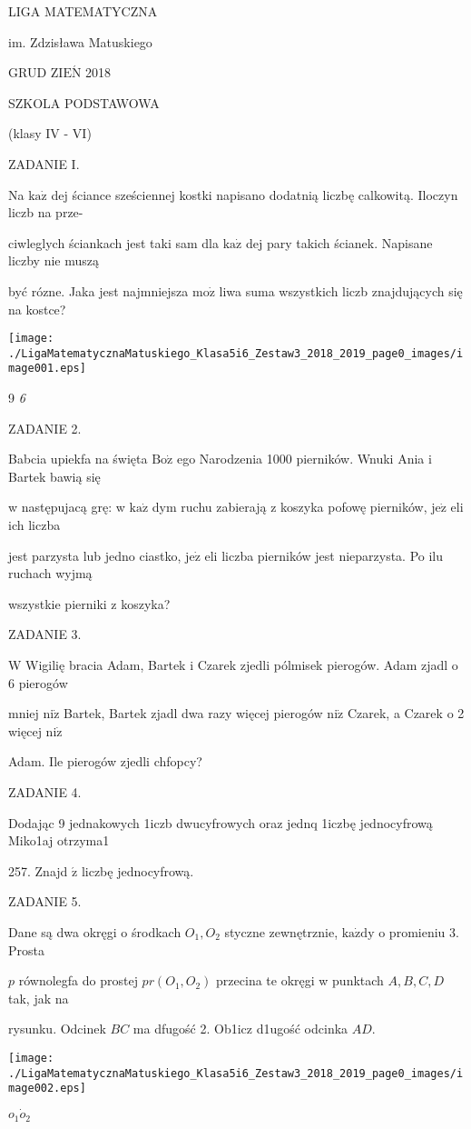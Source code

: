 \documentclass[a4paper,12pt]{article}
\begin{document}
LIGA MATEMATYCZNA

im. Zdzisława Matuskiego

GRUD Z$\mathrm{I}\mathrm{E}\acute{\mathrm{N}}$ 2018

SZKOLA PODSTAWOWA

(klasy IV - VI)

ZADANIE I.

Na $\mathrm{k}\mathrm{a}\dot{\mathrm{z}}$ dej ściance sześciennej kostki napisano dodatnią liczbę calkowitą. Iloczyn liczb na prze-

ciwleglych ściankach jest taki sam dla $\mathrm{k}\mathrm{a}\dot{\mathrm{z}}$ dej pary takich ścianek. Napisane liczby nie muszą

być rózne. Jaka jest najmniejsza $\mathrm{m}\mathrm{o}\dot{\mathrm{z}}$ liwa suma wszystkich liczb znajdujących się na kostce?
\begin{center}
\texttt{[image: ./LigaMatematycznaMatuskiego\_Klasa5i6\_Zestaw3\_2018\_2019\_page0\_images/image001.eps]}
\end{center}
9 {\it 6}

ZADANIE 2.

Babcia upiekfa na święta $\mathrm{B}\mathrm{o}\dot{\mathrm{z}}$ ego Narodzenia 1000 pierników. Wnuki Ania i Bartek bawią się

w następujacą grę: w $\mathrm{k}\mathrm{a}\dot{\mathrm{z}}$ dym ruchu zabierają z koszyka pofowę pierników, $\mathrm{j}\mathrm{e}\dot{\mathrm{z}}$ eli ich liczba

jest parzysta lub jedno ciastko, $\mathrm{j}\mathrm{e}\dot{\mathrm{z}}$ eli liczba pierników jest nieparzysta. Po ilu ruchach wyjmą

wszystkie pierniki z koszyka?

ZADANIE 3.

W Wigilię bracia Adam, Bartek i Czarek zjedli pólmisek pierogów. Adam zjadl o 6 pierogów

mniej $\mathrm{n}\mathrm{i}\dot{\mathrm{z}}$ Bartek, Bartek zjadl dwa razy więcej pierogów $\mathrm{n}\mathrm{i}\dot{\mathrm{z}}$ Czarek, a Czarek o 2 więcej $\mathrm{n}\mathrm{i}\dot{\mathrm{z}}$

Adam. Ile pierogów zjedli chfopcy?

ZADANIE 4.

Dodając 9 jednakowych 1iczb dwucyfrowych oraz jednq 1iczbę jednocyfrową Miko1aj otrzyma1

257. Znajd $\acute{\mathrm{z}}$ liczbę jednocyfrową.

ZADANIE 5.

Dane są dwa okręgi o środkach $O_{1}, O_{2}$ styczne zewnętrznie, $\mathrm{k}\mathrm{a}\dot{\mathrm{z}}\mathrm{d}\mathrm{y}$ o promieniu 3. Prosta

$p$ równolegfa do prostej $pr(O_{1},O_{2})$ przecina te okręgi w punktach $A, B, C, D$ tak, jak na

rysunku. Odcinek $BC$ ma dfugość 2. Ob1icz d1ugość odcinka $AD.$
\begin{center}
\texttt{[image: ./LigaMatematycznaMatuskiego\_Klasa5i6\_Zestaw3\_2018\_2019\_page0\_images/image002.eps]}
\end{center}
$o_{1}  \dot{o}_{2}$
\end{document}
